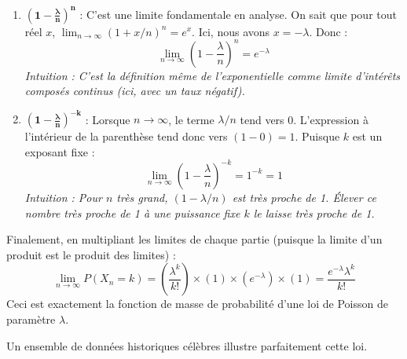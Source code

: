 \begin{proofbox}
\begin{enumerate}
    \item $\mathbf{\left(1-\frac{\lambda}{n}\right)^n}$ : C'est une limite fondamentale en analyse. On sait que pour tout réel $x$, $\lim_{n \to \infty} (1 + x/n)^n = e^x$. Ici, nous avons $x = -\lambda$. Donc :
    $$ \lim_{n \to \infty} \left(1-\frac{\lambda}{n}\right)^n = e^{-\lambda} $$
    \textit{Intuition : C'est la définition même de l'exponentielle comme limite d'intérêts composés continus (ici, avec un taux négatif).}

    \item $\mathbf{\left(1-\frac{\lambda}{n}\right)^{-k}}$ : Lorsque $n \to \infty$, le terme $\lambda/n$ tend vers 0. L'expression à l'intérieur de la parenthèse tend donc vers $(1-0) = 1$. Puisque $k$ est un exposant fixe :
    $$ \lim_{n \to \infty} \left(1-\frac{\lambda}{n}\right)^{-k} = 1^{-k} = 1 $$
    \textit{Intuition : Pour $n$ très grand, $(1-\lambda/n)$ est très proche de 1. Élever ce nombre très proche de 1 à une puissance fixe $k$ le laisse très proche de 1.}
\end{enumerate}
Finalement, en multipliant les limites de chaque partie (puisque la limite d'un produit est le produit des limites) :
$$ \lim_{n \to \infty} P(X_n=k) = \left(\frac{\lambda^k}{k!}\right) \times (1) \times (e^{-\lambda}) \times (1) = \frac{e^{-\lambda}\lambda^k}{k!} $$
Ceci est exactement la fonction de masse de probabilité d'une loi de Poisson de paramètre $\lambda$.
\end{proofbox}


Un ensemble de données historiques célèbres illustre parfaitement cette loi.

